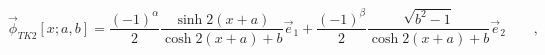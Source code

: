 \begin{equation}
\vec{\phi}_{TK2}[x;a,b]=\frac{(-1)^\alpha }{2} \frac{\sinh 2
(x+a)}{\cosh 2 (x+a)+b}\vec{e}_1+ \frac{(-1)^\beta}{2}
\frac{\sqrt{b^2-1}}{\cosh 2 (x+a)+b}\vec{e}_2 \qquad ,
\label{eq:fam2}
\end{equation}

